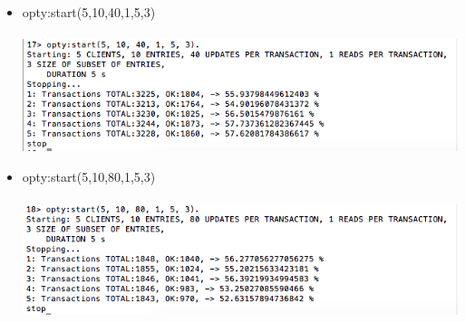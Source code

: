 \documentclass[a4paper, 11pt]{article}
\begin{document}
\begin{itemize}
\item opty:start(5,10,40,1,5,3)\\\\
\includegraphics[scale=0.5]{images/exp-iii-5.png} \\
\newpage
\item opty:start(5,10,80,1,5,3)\\\\
\includegraphics[scale=0.5]{images/exp-iii-6.png} \\
\end{itemize}
%
\end{document}
